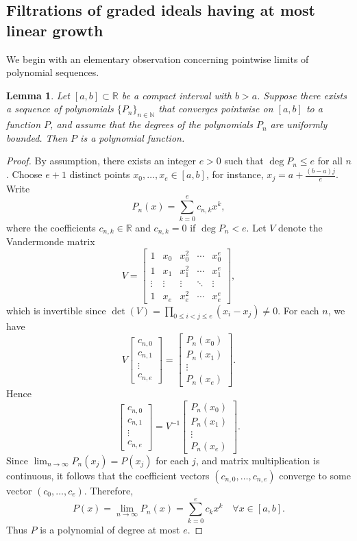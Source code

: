 \documentclass[12pt,a4paper]{amsart}
\theoremstyle{plain}
\newtheorem{lemma}[theorem]{Lemma}
\theoremstyle{definition}
\numberwithin{equation}{theorem}
\begin{document}
\subsection{Filtrations of graded ideals having at most linear growth}

We begin with an elementary observation concerning pointwise limits of polynomial sequences.

\begin{lemma}\label{elementary}
Let $[a,b]\subset \mathbb{R}$ be a compact interval with $b>a$. Suppose there exists a sequence of polynomials $\{P_n\}_{n\in\mathbb{N}}$ that converges pointwise on $[a,b]$ to a function $P$, and assume that the degrees of the polynomials $P_n$ are uniformly bounded. Then $P$ is a polynomial function.
\end{lemma}

\begin{proof}
By assumption, there exists an integer $e>0$ such that $\deg P_n\le e$ for all $n$. Choose $e+1$ distinct points $x_0,\dots,x_e\in[a,b]$, for instance, $x_j = a+\tfrac{(b-a)j}{e}$. Write
\[
P_n(x) = \sum_{k=0}^e c_{n,k}x^k,
\]
where the coefficients $c_{n,k}\in\mathbb{R}$ and $c_{n,k}=0$ if $\deg P_n<e$. Let $V$ denote the Vandermonde matrix
\[
V =
\begin{bmatrix}
1 & x_0 & x_0^2 & \cdots & x_0^e\\
1 & x_1 & x_1^2 & \cdots & x_1^e\\
\vdots & \vdots & \vdots & \ddots & \vdots\\
1 & x_e & x_e^2 & \cdots & x_e^e
\end{bmatrix},
\]
which is invertible since $\det(V) = \prod\limits_{0\leq i<j\leq e}(x_i-x_j) \neq 0$. For each $n$, we have
\[
V
\begin{bmatrix}
c_{n,0}\\
c_{n,1}\\
\vdots\\
c_{n,e}
\end{bmatrix}
=
\begin{bmatrix}
P_n(x_0)\\
P_n(x_1)\\
\vdots\\
P_n(x_e)
\end{bmatrix}.
\]
Hence
\[
\begin{bmatrix}
c_{n,0}\\
c_{n,1}\\
\vdots\\
c_{n,e}
\end{bmatrix}
=
V^{-1}
\begin{bmatrix}
P_n(x_0)\\
P_n(x_1)\\
\vdots\\
P_n(x_e)
\end{bmatrix}.
\]
Since $\lim_{n\to\infty}P_n(x_j) = P(x_j)$ for each $j$, and matrix multiplication is continuous,
it follows that the coefficient vectors $(c_{n,0},\dots,c_{n,e})$ converge to some vector $(c_0,\dots,c_e)$. Therefore,
\[
P(x) = \lim_{n\to\infty} P_n(x) = \sum_{k=0}^e c_k x^k \quad \forall x\in[a,b].
\]
Thus $P$ is a polynomial of degree at most $e$.
\end{proof}
\end{document}
